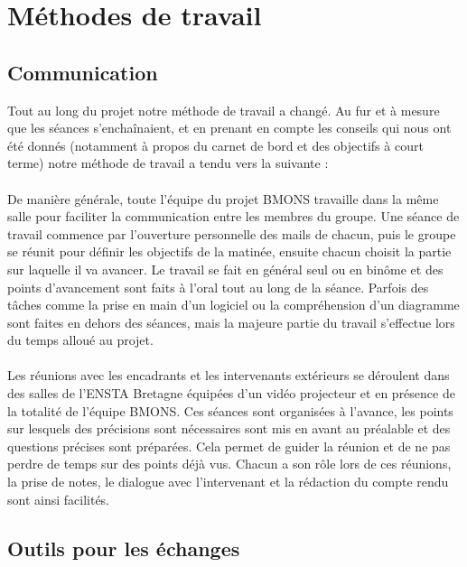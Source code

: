 ﻿\chapter{Méthodes de travail}


\section{Communication}
\vspace{1.0cm}
Tout au long du projet notre méthode de travail a changé. Au fur et à mesure que les séances s’enchaînaient, et en prenant en compte les conseils qui nous ont été donnés (notamment à propos du carnet de bord et des objectifs à court terme) notre méthode de travail a tendu vers la suivante : \\ \\
De manière générale, toute l'équipe du projet BMONS travaille dans la même salle pour faciliter la communication entre les membres du groupe. Une séance de travail commence par l'ouverture personnelle des mails de chacun, puis le groupe se réunit pour définir les objectifs de la matinée, ensuite chacun choisit la partie sur laquelle il va avancer. Le travail se fait en général seul ou en binôme et des points d'avancement sont faits à l'oral tout au long de la séance. Parfois des tâches comme la prise en main d'un logiciel ou la compréhension d'un diagramme sont faites en dehors des séances, mais la majeure partie du travail s'effectue lors du temps alloué au projet. \\ \\
Les réunions avec les encadrants et les intervenants extérieurs se déroulent dans des salles de l'ENSTA Bretagne équipées d'un vidéo projecteur et en présence de la totalité de l'équipe BMONS. Ces séances sont organisées à l'avance, les points sur lesquels des précisions sont nécessaires sont mis en avant au préalable et des questions précises sont préparées. Cela permet de guider la réunion et de ne pas perdre de temps sur des points déjà vus. Chacun a son rôle lors de ces réunions, la prise de notes, le dialogue avec l'intervenant et la rédaction du compte rendu sont ainsi facilités.

\section{Outils pour les échanges}
\vspace{1.5cm}

